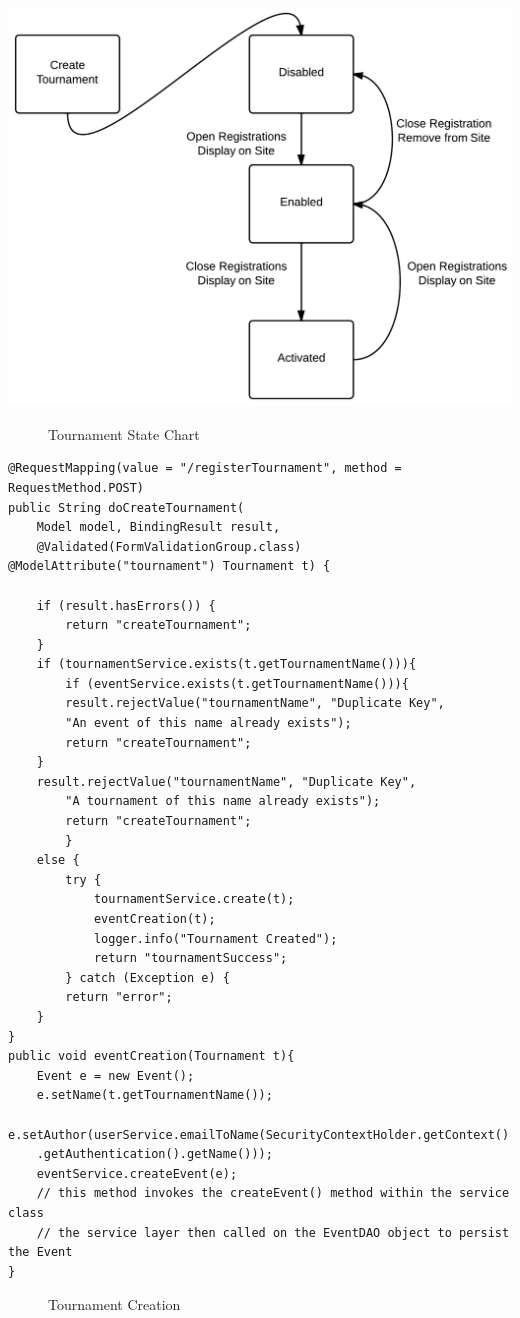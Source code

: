 \begin{center}
\includegraphics[scale=0.3]{tourstate.png}
\end{center}
\begin{figure}[H]
\caption{Tournament State Chart}
\label{fig:tourstate}
\end{figure}


\begin{lstlisting}
@RequestMapping(value = "/registerTournament", method = RequestMethod.POST)
public String doCreateTournament(
	Model model, BindingResult result,
	@Validated(FormValidationGroup.class) @ModelAttribute("tournament") Tournament t) {
	
	if (result.hasErrors()) {
		return "createTournament";
	} 
	if (tournamentService.exists(t.getTournamentName())){
		if (eventService.exists(t.getTournamentName())){
		result.rejectValue("tournamentName", "Duplicate Key",
		"An event of this name already exists");
		return "createTournament";
	}
	result.rejectValue("tournamentName", "Duplicate Key",
		"A tournament of this name already exists");
		return "createTournament";
		}
	else {
		try {
			tournamentService.create(t);
			eventCreation(t);
			logger.info("Tournament Created");
			return "tournamentSuccess";
		} catch (Exception e) {
		return "error";
	}
}
public void eventCreation(Tournament t){
	Event e = new Event();
	e.setName(t.getTournamentName());
	e.setAuthor(userService.emailToName(SecurityContextHolder.getContext()
	.getAuthentication().getName()));
	eventService.createEvent(e); 
	// this method invokes the createEvent() method within the service class
	// the service layer then called on the EventDAO object to persist the Event
}
\end{lstlisting}
\begin{figure}[H]
\caption{Tournament Creation}
\label{fig:tourCreate}
\end{figure}

